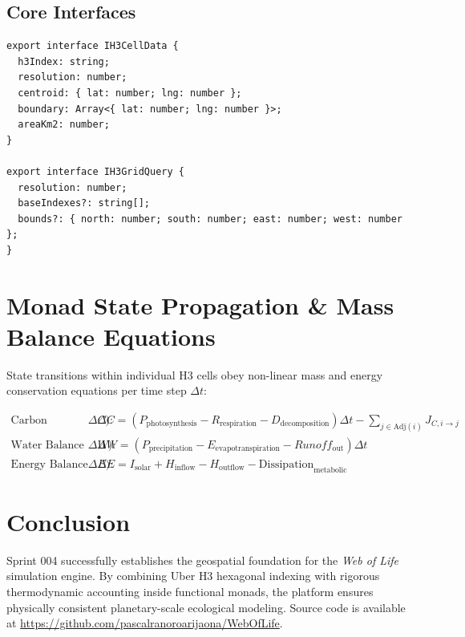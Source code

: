 \documentclass[11pt, a4paper]{article}
\begin{document}
\subsection{Core Interfaces}
\begin{verbatim}
export interface IH3CellData {
  h3Index: string;
  resolution: number;
  centroid: { lat: number; lng: number };
  boundary: Array<{ lat: number; lng: number }>;
  areaKm2: number;
}

export interface IH3GridQuery {
  resolution: number;
  baseIndexes?: string[];
  bounds?: { north: number; south: number; east: number; west: number };
}
\end{verbatim}

\section{Monad State Propagation \& Mass Balance Equations}
State transitions within individual H3 cells obey non-linear mass and energy conservation equations per time step $\Delta t$:

\begin{align}
    \text{Carbon Balance ($\Delta C$):} \quad &\Delta C = \left( P_{\text{photosynthesis}} - R_{\text{respiration}} - D_{\text{decomposition}} \right) \Delta t - \sum_{j \in \text{Adj}(i)} J_{C, i \to j} \\
    \text{Water Balance ($\Delta W$):} \quad &\Delta W = \left( P_{\text{precipitation}} - E_{\text{evapotranspiration}} - Runoff_{\text{out}} \right) \Delta t \\
    \text{Energy Balance ($\Delta E$):} \quad &\Delta E = I_{\text{solar}} + H_{\text{inflow}} - H_{\text{outflow}} - \text{Dissipation}_{\text{metabolic}}
\end{align}

\section{Conclusion}
Sprint 004 successfully establishes the geospatial foundation for the \textit{Web of Life} simulation engine. By combining Uber H3 hexagonal indexing with rigorous thermodynamic accounting inside functional monads, the platform ensures physically consistent planetary-scale ecological modeling. Source code is available at \url{https://github.com/pascalranoroarijaona/WebOfLife}.
\end{document}
